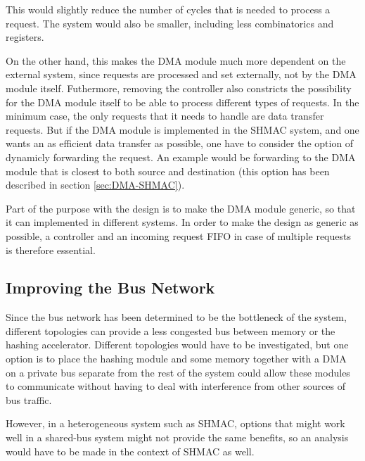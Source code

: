 This would slightly reduce the number of cycles that is needed to process a request.
The system would also be smaller, including less combinatorics and registers.

On the other hand, this makes the DMA module much more dependent on the external system, since requests are processed and set externally, not by the DMA module itself.
Futhermore, removing the controller also constricts the possibility for the DMA module itself to be able to process different types of requests.
In the minimum case, the only requests that it needs to handle are data transfer requests.
But if the DMA module is implemented in the SHMAC system, and one wants an as efficient data transfer as possible, one have to consider the option of dynamicly forwarding the request.
An example would be forwarding to the DMA module that is closest to both source and destination (this option has been described in section \ref{sec:DMA-SHMAC}).

Part of the purpose with the design is to make the DMA module generic, so that it can implemented in different systems.
In order to make the design as generic as possible, a controller and an incoming request FIFO
in case of multiple requests is therefore essential.

\subsection{Improving the Bus Network}
Since the bus network has been determined to be the bottleneck of the system, different topologies
can provide a less congested bus between memory or the hashing accelerator. Different topologies
would have to be investigated, but one option is to place the hashing module and some memory together
with a DMA on a private bus separate from the rest of the system could allow these modules to
communicate without having to deal with interference from other sources of bus traffic.

However, in a heterogeneous system such as SHMAC, options that might work well in a shared-bus
system might not provide the same benefits, so an analysis would have to be made in the context
of SHMAC as well.

